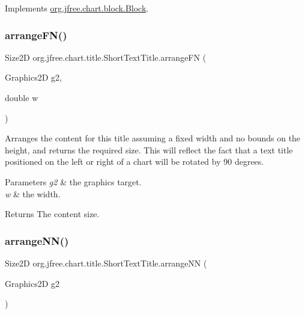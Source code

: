 Implements \mbox{\hyperlink{interfaceorg_1_1jfree_1_1chart_1_1block_1_1_block_ab4cabbc237c5277a4a0018bab930e5fe}{org.\+jfree.\+chart.\+block.\+Block}}.

\mbox{\label{classorg_1_1jfree_1_1chart_1_1title_1_1_short_text_title_a0430c8589779585237859f4449d74e17}} 
\subsubsection{\texorpdfstring{arrange\+F\+N()}{arrangeFN()}}
{\footnotesize\ttfamily Size2D org.\+jfree.\+chart.\+title.\+Short\+Text\+Title.\+arrange\+FN (\begin{DoxyParamCaption}\item[{Graphics2D}]{g2,  }\item[{double}]{w }\end{DoxyParamCaption})\hspace{0.3cm}{\ttfamily [protected]}}

Arranges the content for this title assuming a fixed width and no bounds on the height, and returns the required size. This will reflect the fact that a text title positioned on the left or right of a chart will be rotated by 90 degrees.


\begin{DoxyParams}{Parameters}
{\em g2} & the graphics target. \\
\hline
{\em w} & the width.\\
\hline
\end{DoxyParams}
\begin{DoxyReturn}{Returns}
The content size. 
\end{DoxyReturn}
\mbox{\label{classorg_1_1jfree_1_1chart_1_1title_1_1_short_text_title_a5b423c038031bfa59c4a73fa595a033f}} 
\subsubsection{\texorpdfstring{arrange\+N\+N()}{arrangeNN()}}
{\footnotesize\ttfamily Size2D org.\+jfree.\+chart.\+title.\+Short\+Text\+Title.\+arrange\+NN (\begin{DoxyParamCaption}\item[{Graphics2D}]{g2 }\end{DoxyParamCaption})\hspace{0.3cm}{\ttfamily [protected]}}

